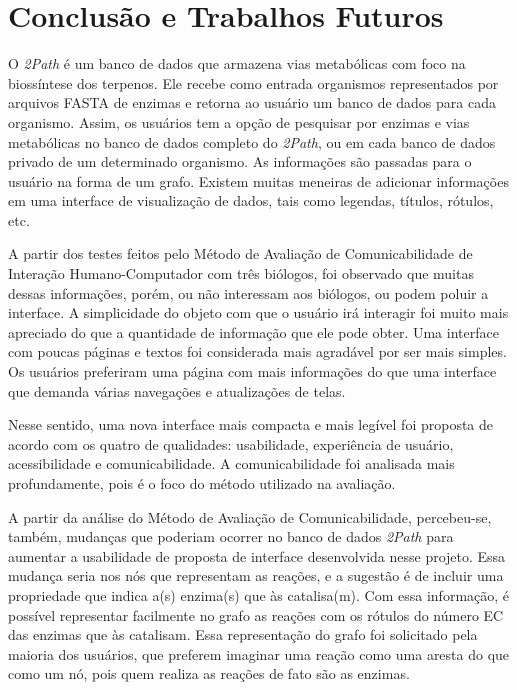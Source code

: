\chapter{Conclusão e Trabalhos Futuros}

\indent O \textit{2Path} é um banco de dados que armazena vias metabólicas com foco na biossíntese dos terpenos. Ele recebe como entrada organismos representados por arquivos FASTA de enzimas e retorna ao usuário um banco de dados para cada organismo. Assim, os usuários tem a opção de pesquisar por enzimas e vias metabólicas no banco de dados completo do \textit{2Path}, ou em cada banco de dados privado de um determinado organismo. As informações são passadas para o usuário na forma de um grafo. Existem muitas meneiras de adicionar informações em uma interface de visualização de dados, tais como legendas, títulos, rótulos, etc. 

\indent A partir dos testes feitos pelo Método de Avaliação de Comunicabilidade de Interação Humano-Computador com três biólogos, foi observado que muitas dessas informações, porém, ou não interessam aos biólogos, ou podem poluir a interface. A simplicidade do objeto com que o usuário irá interagir foi muito mais apreciado do que a quantidade de informação que ele pode obter. Uma interface com poucas páginas e textos foi considerada mais agradável por ser mais simples. Os usuários preferiram uma página com mais informações do que uma interface que demanda várias navegações e atualizações de telas. 

\indent Nesse sentido, uma nova interface mais compacta e mais legível foi proposta de acordo com os quatro de  qualidades: usabilidade, experiência de usuário, acessibilidade e comunicabilidade. A comunicabilidade foi analisada mais profundamente, pois é o foco do método utilizado na avaliação.

\indent A partir da análise do Método de Avaliação de Comunicabilidade, percebeu-se, também, mudanças que poderiam ocorrer no banco de dados \textit{2Path} para aumentar a usabilidade de proposta de interface desenvolvida nesse projeto. Essa mudança seria nos nós que representam as reações, e a sugestão é de incluir uma propriedade que indica a(s) enzima(s) que às catalisa(m). Com essa informação, é possível representar facilmente no grafo as reações com os rótulos do número EC das enzimas que às catalisam. Essa representação do grafo foi solicitado pela maioria dos usuários, que preferem imaginar uma reação como uma aresta do que como um nó, pois quem realiza as reações de fato são as enzimas.
